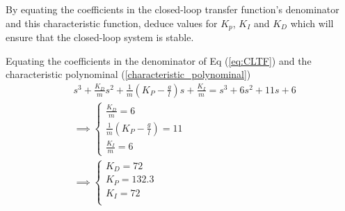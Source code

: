 \begin{questions}
\newpage
\question[3M]
By equating the coefficients in the closed-loop transfer function's denominator and this characteristic function, deduce values for $K_p$, $K_I$ and $K_D$ which will ensure that the closed-loop system is stable.

\begin{solution}
   Equating the coefficients in the denominator of Eq (\ref{eq:CLTF}) and the characteristic polynominal (\ref{characteristic_polynominal})
   \begin{align*}
   &s^3 + \frac{K_D}{m} s^2 + \frac{1}{m} (K_P-\frac{g}{l}) s + \frac{K_I}{m} = s^3 + 6s^2 + 11s +6 \\
   &\implies
   \begin{cases}
   \frac{K_D}{m} = 6 \\
   \frac{1}{m} (K_P - \frac{g}{l}) = 11 \\
   \frac{K_I}{m} = 6
   \end{cases} \\
   &\implies
   \begin{cases}
   K_D = 72 \\
   K_P = 132.3 \\
   K_I = 72 \\
   \end{cases}
   \end{align*}
\end{solution}

\setcounter{lastquestioncounter}{\value{question}}
\end{questions}

